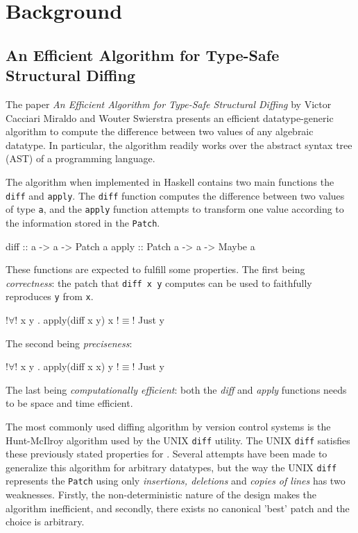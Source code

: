 \section{Background}

\subsection{An Efficient Algorithm for Type-Safe Structural Diffing}
The paper \textit{An Efficient Algorithm for Type-Safe Structural Diffing} by Victor Cacciari Miraldo and Wouter Swierstra presents an efficient datatype-generic algorithm to compute the difference between two values of any algebraic datatype. In particular, the algorithm readily works over the abstract syntax tree (AST) of a programming language\cite{miraldo2019efficient}.

The algorithm when implemented in Haskell contains two main functions the \texttt{diff} and \texttt{apply}. The \texttt{diff} function computes the difference between two values of type \texttt{a}, and the \texttt{apply} function attempts to transform one value according to the information stored in the \texttt{Patch}.
\begin{haskell}
    diff  :: a -> a -> Patch a
    apply :: Patch a -> a -> Maybe a
\end{haskell}

These functions are expected to fulfill some properties. The first being \textit{correctness}: the patch that \texttt{diff x y} computes can be used to faithfully reproduces \texttt{y} from \texttt{x}.
\begin{haskell}
    !$\forall$! x y . apply(diff x y) x !$\equiv$! Just y
\end{haskell}
The second being \textit{preciseness}:
\begin{haskell}
    !$\forall$! x y . apply(diff x x) y !$\equiv$! Just y
\end{haskell}
The last being \textit{computationally efficient}: both the \textit{diff} and \textit{apply} functions needs to be space and time efficient.

The most commonly used diffing algorithm by version control systems is the Hunt-McIlroy algorithm used by the UNIX \texttt{diff} utility\cite{hunt1976algorithm}. The UNIX \texttt{diff} satisfies these previously stated properties for \cite{miraldo2019efficient}. Several attempts have been made to generalize this algorithm for arbitrary datatypes, but the way the UNIX \texttt{diff} represents the \texttt{Patch} using only \textit{insertions, deletions} and \textit{copies of lines} has two weaknesses. Firstly, the non-deterministic nature of the design makes the algorithm inefficient, and secondly, there exists no canonical 'best' patch and the choice is arbitrary\cite{miraldo2019efficient}.

